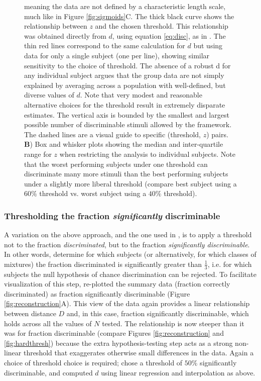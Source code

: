 \documentclass[letterpaper,twocolumn,10pt]{article}
\begin{document}
\begin{figure}[!hbtp]
{meaning the data are not defined by a characteristic length scale, much like in Figure \ref{fig:sigmoids}C.
The thick black curve shows the relationship between $z$ and the chosen threshold. 
This relationship was obtained directly from $d$, using equation \ref{eq:disc}, as in \cite{bushdid_humans_2014}. 
The thin red lines correspond to the same calculation for $d$ but using data for only a single subject (one per line), 
showing similar sensitivity to the choice of threshold. 
The absence of a robust d for any individual subject argues that the group data are not simply explained by averaging across a population with well-defined, but diverse values of $d$. 
Note that very modest and reasonable alternative choices for the threshold result in extremely disparate estimates. 
The vertical axis is bounded by the smallest and largest possible number of discriminable stimuli allowed by the framework.  
The dashed lines are a visual guide to specific (threshold, $z$) pairs.
\textbf{B}) Box and whisker plots showing the median and inter-quartile range for $z$ when restricting the analysis to individual subjects. 
Note that the worst performing subjects under one threshold can discriminate many more stimuli than the best performing subjects under a slightly more liberal threshold (compare best subject using a $60\%$ threshold vs. worst subject using a $40\%$ threshold).}
    \label{fig:z_d_threshold}
\end{figure}

\subsubsection{Thresholding the fraction \emph{significantly} discriminable} 
A variation on the above approach, and the one used in \cite{bushdid_humans_2014}, 
is to apply a threshold not to the fraction \textit{discriminated}, 
but to the fraction \textit{significantly discriminable}.  
In other words, determine for which subjects (or alternatively, for which classes of mixtures) the fraction discriminated is significantly greater than $\frac{1}{3}$, 
i.e. for which subjects the null hypothesis of chance discrimination can be rejected.  
To facilitate visualization of this step, \cite{bushdid_humans_2014} re-plotted the summary data (fraction correctly discriminated) as fraction significantly discriminable (Figure \ref{fig:reconstruction}A).  
This view of the data again provides a linear relationship between distance $D$ and, in this case, fraction significantly discriminable, 
which holds across all the values of $N$ tested.  
The relationship is now steeper than it was for fraction discriminable (compare Figures \ref{fig:reconstruction} and \ref{fig:hardthresh}) 
because the extra hypothesis-testing step acts as a strong non-linear threshold that exaggerates otherwise small differences in the data.  
Again a choice of threshold choice is required; \cite{bushdid_humans_2014} chose a threshold of $50\%$ significantly discriminable, 
and computed $d$ using linear regression and interpolation as above.  
\end{document}
